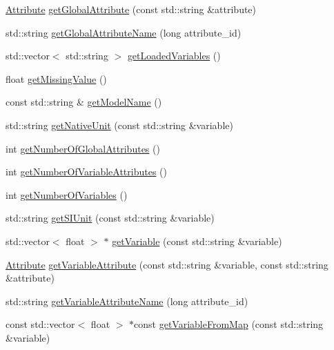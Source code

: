 \begin{DoxyCompactItemize}
\hyperlink{classccmc_1_1_attribute}{Attribute} \hyperlink{classccmc_1_1_kameleon_a89be090186b6019598ea05967625455c}{get\-Global\-Attribute} (const std\-::string \&attribute)
\item 
std\-::string \hyperlink{classccmc_1_1_kameleon_a1261563846a3faf15448d85f5513feab}{get\-Global\-Attribute\-Name} (long attribute\-\_\-id)
\item 
std\-::vector$<$ std\-::string $>$ \hyperlink{classccmc_1_1_kameleon_ab4fd3e9500099ad69de3b54565ee68db}{get\-Loaded\-Variables} ()
\item 
float \hyperlink{classccmc_1_1_kameleon_a951f273a82198c84ba98e30a7a4bace7}{get\-Missing\-Value} ()
\item 
const std\-::string \& \hyperlink{classccmc_1_1_kameleon_aa2d4fbdefe2492bf8132e5e76411e542}{get\-Model\-Name} ()
\item 
std\-::string \hyperlink{classccmc_1_1_kameleon_aca6a8410aa27c662bc24348df24b939b}{get\-Native\-Unit} (const std\-::string \&variable)
\item 
int \hyperlink{classccmc_1_1_kameleon_a4da989eb8f5b56b397d1e5536881cf2c}{get\-Number\-Of\-Global\-Attributes} ()
\item 
int \hyperlink{classccmc_1_1_kameleon_aaecaabf2cdd3370505729dd666e75b3f}{get\-Number\-Of\-Variable\-Attributes} ()
\item 
int \hyperlink{classccmc_1_1_kameleon_abd7d970692583bc3ff4fe09a5ad7266e}{get\-Number\-Of\-Variables} ()
\item 
std\-::string \hyperlink{classccmc_1_1_kameleon_a0002caf4908097deda7cdf5508d63bdc}{get\-S\-I\-Unit} (const std\-::string \&variable)
\item 
std\-::vector$<$ float $>$ $\ast$ \hyperlink{classccmc_1_1_kameleon_ac8ee40843afc1cc04a7b1cd8d51bfed3}{get\-Variable} (const std\-::string \&variable)
\begin{DoxyCompactList}\small\item\em \end{DoxyCompactList}\item 
\hyperlink{classccmc_1_1_attribute}{Attribute} \hyperlink{classccmc_1_1_kameleon_a8791585b0542359be09fe26e5b6488d7}{get\-Variable\-Attribute} (const std\-::string \&variable, const std\-::string \&attribute)
\item 
std\-::string \hyperlink{classccmc_1_1_kameleon_a9057b8600d5fcd9a045c9f87a5fffa6e}{get\-Variable\-Attribute\-Name} (long attribute\-\_\-id)
\item 
const std\-::vector$<$ float $>$ $\ast$const \hyperlink{classccmc_1_1_kameleon_a62c73c04706b7702ea499138dc97c14b}{get\-Variable\-From\-Map} (const std\-::string \&variable)

\end{DoxyCompactItemize}
